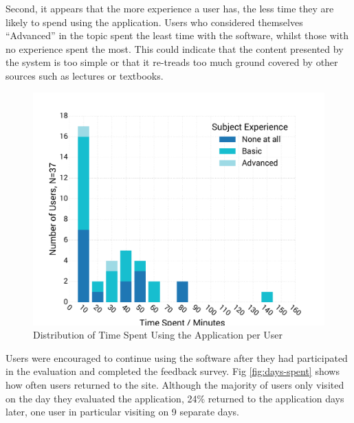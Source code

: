 \documentclass[bsc,twoside,singlespacing,parskip,logo,notimes,normalheadings]{infthesis}
\begin{document}
    Second, it appears that the more experience a user has, the less
    time they are likely to spend using the application. Users who
    considered themselves ``Advanced'' in the topic spent the least
    time with the software, whilst those with no experience spent the
    most. This could indicate that the content presented by the system
    is too simple or that it re-treads too much ground covered by
    other sources such as lectures or textbooks.

    \begin{figure}[!hb]
      \centering
      \vspace{-2mm}
      \includegraphics[width=.80\textwidth, trim=0 20 0 45, clip]{img/time_distribution.pdf}
      \captionsetup{width=\textwidth, justification=centering}
      \caption{Distribution of Time Spent Using the Application per User}\label{fig:time-hist}
    \end{figure}

    Users were encouraged to continue using the software after they
    had participated in the evaluation and completed the feedback
    survey. Fig \ref{fig:days-spent} shows how often users returned to
    the site. Although the majority of users only visited on the day
    they evaluated the application, 24\% returned to the application
    days later, one user in particular visiting on 9 separate days.
\end{document}
